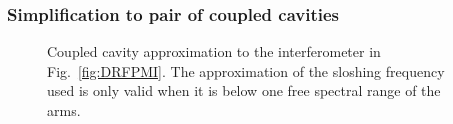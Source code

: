 
\subsubsection{Simplification to pair of coupled cavities}

\begin{figure}
	\centering
	\caption{Coupled cavity approximation to the interferometer in Fig.~\ref{fig:DRFPMI}. The approximation of the sloshing frequency used is only valid when it is below one free spectral range of the arms. }
	\label{fig:coupled_cavity_approx}
\end{figure}


